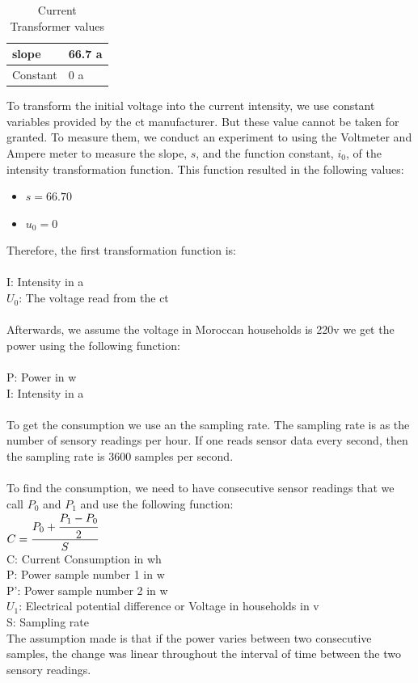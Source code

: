 \documentclass[oneside,12pt,a4paper,final]{book}
\begin{document}
\begin{table}
    \begin{tabular}{ll}
    \hline
    slope    & 66.7 \gls{a} \\ \hline
    Constant & 0 \gls{a}    \\ \hline
    \end{tabular}
    \caption{Current Transformer values}
        \label{table:CT_vals}
\end{table}
To transform the initial voltage into the current intensity, we use constant variables provided by the \gls{ct} manufacturer. But these value cannot be taken for granted. To measure them, we conduct an experiment to using the Voltmeter and Ampere meter to measure the slope, $s$, and the function constant, $i_0$, of the intensity transformation function. This function resulted in the following values: 
\begin{itemize}
\item $s = 66.70$
\item $u_0 = 0$
\end{itemize}
Therefore, the first transformation function is: \\
 \\
I: Intensity in \gls{a} \\
$U_0$: The voltage read from the \gls{ct}

\paragraph{}
Afterwards, we assume the voltage in Moroccan households is 220\gls{v} we get the power using the following function:
\\
 \\
P: Power in \gls{w} \\
I: Intensity in \gls{a}
\paragraph{}
To get the consumption we use an the sampling rate. The sampling rate is as the number of sensory readings per hour. If one reads sensor data every second, then the sampling rate is 3600 samples per second.
\paragraph{}
To find the consumption, we need to have consecutive sensor readings that we call $P_0$ and $P_1$ and use the following function:
\\
$ C = \cfrac{P_0 + \cfrac{P_1 - P_0}{2}}{S} $ \\
C: Current Consumption in \gls{wh} \\
P: Power sample number 1 in \gls{w} \\
P': Power sample number 2 in \gls{w} \\
$U_1$: Electrical potential difference or Voltage in households in \gls{v} \\
S: Sampling rate \\
The assumption made is that if the power varies between two consecutive samples, the change was linear throughout the interval of time between the two sensory readings.
\end{document}
